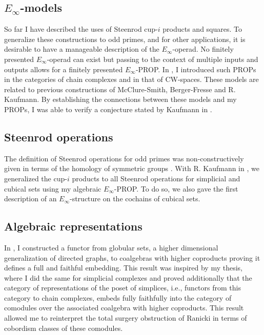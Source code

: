 \subsection{$E_\infty$-models}
So far I have described the uses of Steenrod cup-$i$ products and squares. To generalize these constructions to odd primes, and for other applications, it is desirable to have a manageable description of the $E_{\infty}$-operad. No finitely presented $E_\infty$-operad can exist but passing to the context of multiple inputs and outputs allows for a finitely presented $E_\infty$-PROP. In \cite{medina2020prop1, medina2018prop2}, I introduced such PROPs in the categories of chain complexes and in that of CW-spaces. These models are related to previous constructions of McClure-Smith, Berger-Fresse and R. Kaufmann. By establishing the connections between these models and my PROPs, I was able to verify a conjecture stated by Kaufmann in \cite{kaufmann2009dimension}.

\subsection{Steenrod operations} \label{ssec: odd primes}
The definition of Steenrod operations for odd primes was non-constructively given in terms of the homology of symmetric groups \cite{steenrod1952reduced, steenrod1962cohomology}. With R. Kaufmann in \cite{medina2020maysteenrod}, we generalized the cup-$i$ products to all Steenrod operations for simplicial and cubical sets using my algebraic $E_\infty$-PROP. To do so, we also gave the first description of an $E_\infty$-structure on the cochains of cubical sets.

\subsection{Algebraic representations}
In \cite{medina2020globular}, I constructed a functor from globular sets, a higher dimensional generalization of directed graphs, to coalgebras with higher coproducts proving it defines a full and faithful embedding. This result was inspired by my thesis, where I did the same for simplicial complexes and proved additionally that the category of representations of the poset of simplices, i.e., functors from this category to chain complexes, embeds fully faithfully into the category of comodules over the associated coalgebra with higher coproducts. This result allowed me to reinterpret the total surgery obstruction of Ranicki \cite{ranicki1992topological} in terms of cobordism classes of these comodules.

